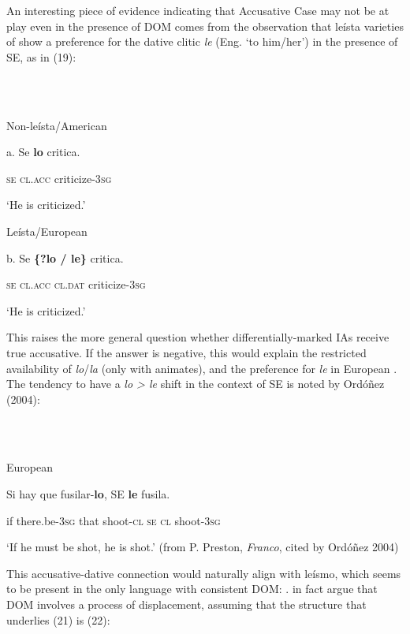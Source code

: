 \documentclass[output=paper]{langsci/langscibook}
\begin{document}
An interesting piece of evidence indicating that Accusative Case may not be at play even in the presence of DOM comes from the observation that leísta varieties of  show a preference for the dative clitic \textit{le} (Eng. ‘to him/her’) in the presence of SE, as in (19):

\ea%
    \label{ex:key:19}
    \gll\\
        \\
    \glt
    \z

          Non-leísta/American 

a.   Se  \textbf{lo}       critica.          

        \textsc{se  cl.acc} criticize\textsc{{}-3}\textsc{sg}

     ‘He is criticized.’

  Leísta/European 

  b.   Se \textbf{\{?lo    /    le\}}       critica.      

            \textsc{se  cl.acc  cl.dat}   criticize\textsc{{}-3}\textsc{sg}

     ‘He is criticized.’

This raises the more general question whether differentially-marked IAs receive true accusative. If the answer is negative, this would explain the restricted availability of \textit{lo}/\textit{la} (only with animates), and the preference for \textit{le} in European . The tendency to have a \textit{lo > le} shift in the context of SE is noted by Ordóñez (2004):

\ea%
    \label{ex:key:20}
    \gll\\
        \\
    \glt
    \z

          European 

Si hay                 que  fusilar-\textbf{lo},  SE \textbf{le} fusila.       

       if  there.be\textsc{{}-3}\textsc{sg}  that  shoot\textsc{{}-cl  se  cl}  shoot\textsc{{}-3}\textsc{sg}

  ‘If he must be shot, he is shot.’ (from P. Preston, \textit{Franco}, cited by Ordóñez 2004)

This accusative-dative connection would naturally align with leísmo, which seems to be present in the only  language with consistent DOM: . \citet{ColominaEtAl2017} in fact argue that DOM involves a process of  displacement, assuming that the structure that underlies (21) is (22):
\end{document}
